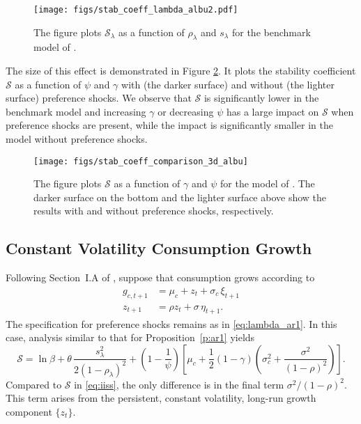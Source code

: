 \documentclass[12pt, reqno]{amsart}
\newcommand{\1}{\mathbbm 1}
\newcommand{\sS}{\mathscr S}
\theoremstyle{plain}
\theoremstyle{definition}
\begin{document}
\begin{figure}
	\centering
	\texttt{[image: figs/stab\_coeff\_lambda\_albu2.pdf]}
    \caption{The figure plots $\sS_\lambda$ as a function of $\rho_\lambda $
    and $s_\lambda$ for the benchmark model of
    \cite{Albuquerque2016}.}\label{f:stab_coeff_lambda_albu_2}
\end{figure}

The size of this effect is demonstrated in Figure
\ref{f:stab_coeff_comparison_3d_albu}. It plots the stability coefficient
$\sS$ as a function of $\psi $ and $\gamma$ with (the darker surface)
and without (the lighter surface) preference shocks. We observe that $\sS$ is
significantly lower in the benchmark model and increasing $\gamma$ or
decreasing $\psi$ has a large impact on $\sS$ when preference shocks are
present, while the impact is significantly smaller in the model without
preference shocks.

\begin{figure}
    \centering
	\texttt{[image: figs/stab\_coeff\_comparison\_3d\_albu]}
	\caption{\label{f:stab_coeff_comparison_3d_albu} The figure plots $\sS$
      as a function of $\gamma$ and $\psi$ for the model of
      \cite{Albuquerque2016}. The darker surface on the bottom and
      the lighter surface above show the results with and without preference
      shocks, respectively.}
\end{figure}

\subsection{Constant Volatility Consumption Growth}

Following Section~I.A of \cite{bansal2004risks}, 
suppose that consumption grows according to
%
\begin{align*}
    g_{c, t+1} 
    & = \mu_c + z_t + \sigma_c \, \xi_{t+1}
        \\
    z_{t+1}
    & = \rho z_t + \sigma \, \eta _{t+1}.
\end{align*}
%
The specification for preference shocks remains as in \eqref{eq:lambda_ar1}.
In this case, analysis similar to that for Proposition~\ref{p:ar1} yields
%
\begin{equation}\label{eq:sscv}
    \sS 
    = \ln \beta
    + \theta \, \frac{s_\lambda^2}{2(1-\rho_\lambda)^2}
    +
    \left(1-\frac{1}{\psi}\right)\left[\mu_c + \frac{1}{2}(1-\gamma)
    \left( \sigma_c^2 + \frac{\sigma^2}{(1-\rho)^2} \right)\right].
\end{equation}
%
Compared to $\sS$ in \eqref{eq:iiss}, the only difference is in the final term
$\sigma^2 / (1-\rho)^2$.  This term arises from the persistent, constant
volatility, long-run growth component $\{z_t\}$.
\end{document}
